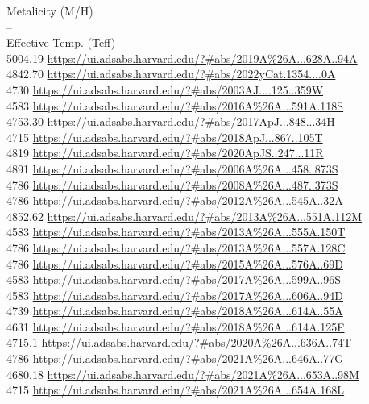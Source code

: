 Metalicity (M/H)\\
--\\
Effective Temp. (Teff)\\
5004.19 \url{https://ui.adsabs.harvard.edu/?#abs/2019A%26A...628A..94A}\\
4842.70 \url{https://ui.adsabs.harvard.edu/?#abs/2022yCat.1354....0A}\\
4730 \url{https://ui.adsabs.harvard.edu/?#abs/2003AJ....125..359W}\\
4583 \url{https://ui.adsabs.harvard.edu/?#abs/2016A%26A...591A.118S}\\
4753.30 \url{https://ui.adsabs.harvard.edu/?#abs/2017ApJ...848...34H}\\
4715 \url{https://ui.adsabs.harvard.edu/?#abs/2018ApJ...867..105T}\\
4819 \url{https://ui.adsabs.harvard.edu/?#abs/2020ApJS..247...11R}\\
4891 \url{https://ui.adsabs.harvard.edu/?#abs/2006A%26A...458..873S}\\
4786 \url{https://ui.adsabs.harvard.edu/?#abs/2008A%26A...487..373S}\\
4786 \url{https://ui.adsabs.harvard.edu/?#abs/2012A%26A...545A..32A}\\
4852.62 \url{https://ui.adsabs.harvard.edu/?#abs/2013A%26A...551A.112M}\\
4583 \url{https://ui.adsabs.harvard.edu/?#abs/2013A%26A...555A.150T}\\
4786 \url{https://ui.adsabs.harvard.edu/?#abs/2013A%26A...557A.128C}\\
4786 \url{https://ui.adsabs.harvard.edu/?#abs/2015A%26A...576A..69D}\\
4583 \url{https://ui.adsabs.harvard.edu/?#abs/2017A%26A...599A..96S}\\
4583 \url{https://ui.adsabs.harvard.edu/?#abs/2017A%26A...606A..94D}\\
4739 \url{https://ui.adsabs.harvard.edu/?#abs/2018A%26A...614A..55A}\\
4631 \url{https://ui.adsabs.harvard.edu/?#abs/2018A%26A...614A.125F}\\
4715.1 \url{https://ui.adsabs.harvard.edu/?#abs/2020A%26A...636A..74T}\\
4786 \url{https://ui.adsabs.harvard.edu/?#abs/2021A%26A...646A..77G}\\
4680.18 \url{https://ui.adsabs.harvard.edu/?#abs/2021A%26A...653A..98M}\\
4715 \url{https://ui.adsabs.harvard.edu/?#abs/2021A%26A...654A.168L}\\
